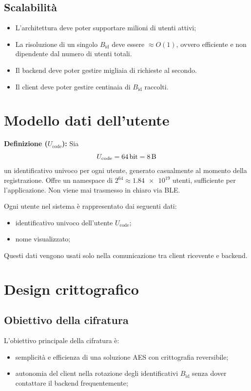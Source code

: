 \documentclass[a4paper,11pt]{article}
\begin{document}
\subsection{Scalabilità}
\begin{itemize}
  \item L'architettura deve poter supportare milioni di utenti attivi;
  \item La risoluzione di un singolo \(B_{\text{id}}\) deve essere \(\approx O(1)\), ovvero efficiente e non dipendente dal numero di utenti totali.
  \item Il backend deve poter gestire migliaia di richieste al secondo.
  \item Il client deve poter gestire centinaia di \(B_{\text{id}}\) raccolti.
\end{itemize}

\section{Modello dati dell'utente}

\textbf{Definizione (\(U_{\text{code}}\)):}
Sia \[U_{\text{code}} = \SI{64}{\bit} = \SI{8}{\byte}\] un identificativo univoco per ogni utente, generato casualmente al momento della registrazione.
Offre un namespace di \(2^{64} \approx \num{1.84e19}\) utenti, sufficiente per l'applicazione.
Non viene mai trasmesso in chiaro via BLE.

Ogni utente nel sistema è rappresentato dai seguenti dati:
\begin{itemize}
  \item identificativo univoco dell'utente \(U_{\text{code}}\);
  \item nome visualizzato;
\end{itemize}

Questi dati vengono usati solo nella comunicazione tra client ricevente e backend.

\section{Design crittografico}
\subsection{Obiettivo della cifratura}
L'obiettivo principale della cifratura è:
\begin{itemize}
  \item semplicità e efficienza di una soluzione AES con crittografia reversibile;
  \item autonomia del client nella rotazione degli identificativi \(B_{\text{id}}\) senza dover contattare il backend frequentemente;
\end{itemize}
\end{document}
